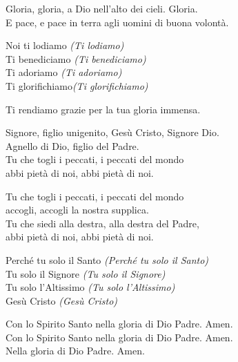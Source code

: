 
Gloria, gloria, a Dio nell'alto dei cieli. Gloria.\\
E pace, e pace in terra agli uomini di buona volontà.

\spazio

Noi ti lodiamo \emph{(Ti lodiamo)}\\
Ti benediciamo \emph{(Ti benediciamo)}\\
Ti adoriamo \emph{(Ti adoriamo)}\\
Ti glorifichiamo\emph{(Ti glorifichiamo)}

\spazio

Ti rendiamo grazie per la tua gloria immensa.

\spazio

Signore, figlio unigenito, Gesù Cristo, Signore Dio.\\
Agnello di Dio, figlio del Padre.\\
Tu che togli i peccati, i peccati del mondo\\
abbi pietà di noi, abbi pietà di noi.

\spazio

Tu che togli i peccati, i peccati del mondo\\
accogli, accogli la nostra supplica.\\
Tu che siedi alla destra, alla destra del Padre,\\
abbi pietà di noi, abbi pietà di noi.

\spazio

Perché tu solo il Santo \emph{(Perché tu solo il Santo)}\\
Tu solo il Signore \emph{(Tu solo il Signore)}\\
Tu solo l'Altissimo \emph{(Tu solo l'Altissimo)}\\
Gesù Cristo \emph{(Gesù Cristo)}

\spazio

Con lo Spirito Santo nella gloria di Dio Padre. Amen.\\
Con lo Spirito Santo nella gloria di Dio Padre. Amen.\\
Nella gloria di Dio Padre. Amen.